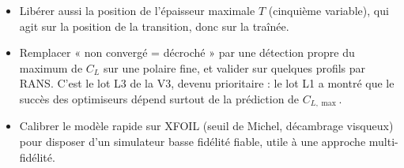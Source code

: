\begin{pistes}
\begin{itemize}
\item Libérer aussi la position de l'épaisseur maximale $T$ (cinquième variable), qui agit sur la position de la transition, donc sur la traînée.
\item Remplacer « non convergé = décroché » par une détection propre du maximum de $C_L$ sur une polaire fine, et valider sur quelques profils par RANS. C'est le lot L3 de la V3, devenu prioritaire : le lot L1 a montré que le succès des optimiseurs dépend surtout de la prédiction de $C_{L,\max}$.
\item Calibrer le modèle rapide sur XFOIL (seuil de Michel, décambrage visqueux) pour disposer d'un simulateur basse fidélité fiable, utile à une approche multi-fidélité.
\end{itemize}
\end{pistes}
